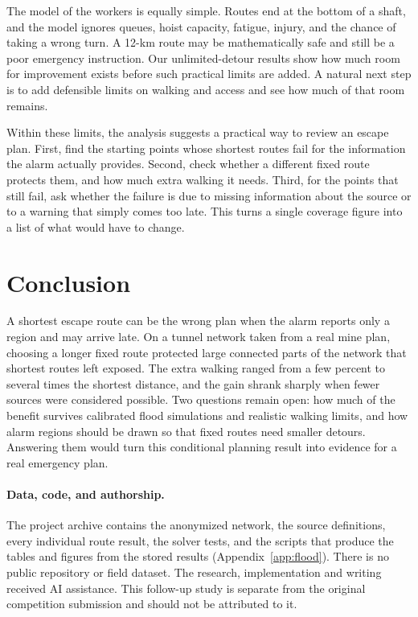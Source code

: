 \documentclass[11pt,a4paper]{article}
\begin{document}
The model of the workers is equally simple. Routes end at the bottom of a shaft, and the model ignores queues, hoist capacity, fatigue, injury, and the chance of taking a wrong turn. A 12-km route may be mathematically safe and still be a poor emergency instruction. Our unlimited-detour results show how much room for improvement exists before such practical limits are added. A natural next step is to add defensible limits on walking and access and see how much of that room remains.

Within these limits, the analysis suggests a practical way to review an escape plan. First, find the starting points whose shortest routes fail for the information the alarm actually provides. Second, check whether a different fixed route protects them, and how much extra walking it needs. Third, for the points that still fail, ask whether the failure is due to missing information about the source or to a warning that simply comes too late. This turns a single coverage figure into a list of what would have to change.

\section{Conclusion}
A shortest escape route can be the wrong plan when the alarm reports only a region and may arrive late. On a tunnel network taken from a real mine plan, choosing a longer fixed route protected large connected parts of the network that shortest routes left exposed. The extra walking ranged from a few percent to several times the shortest distance, and the gain shrank sharply when fewer sources were considered possible. Two questions remain open: how much of the benefit survives calibrated flood simulations and realistic walking limits, and how alarm regions should be drawn so that fixed routes need smaller detours. Answering them would turn this conditional planning result into evidence for a real emergency plan.

\paragraph{Data, code, and authorship.}
The project archive contains the anonymized network, the source definitions, every individual route result, the solver tests, and the scripts that produce the tables and figures from the stored results (Appendix~\ref{app:flood}). There is no public repository or field dataset. The research, implementation and writing received AI assistance. This follow-up study is separate from the original competition submission and should not be attributed to it.
\end{document}
